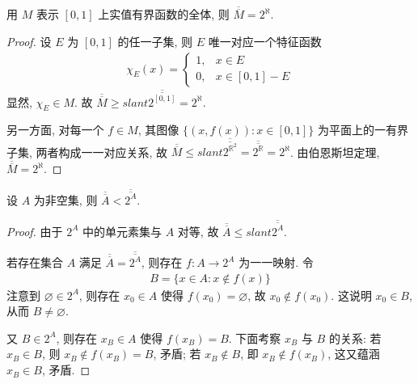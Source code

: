 \documentclass[../../main.tex]{subfiles}
\begin{document}
\begin{example}
用 $M$ 表示 $[0, 1]$ 上实值有界函数的全体, 则 $\overline{\overline{M}} = 2^{\aleph}$.
\end{example}
\begin{proof}
设 $E$ 为 $[0, 1]$ 的任一子集, 则 $E$ 唯一对应一个特征函数
\begin{align*}
\chi_E(x) = 
\begin{cases}
1, & x \in E\\
0, & x \in [0, 1] - E
\end{cases}
\end{align*}
显然, $\chi_E \in M$. 故 $\overline{\overline{M}} \geqslant slant \overline{\overline{2^{[0, 1]}}} = 2^{\aleph}$.

另一方面, 对每一个 $f \in M$, 其图像 $\{(x, f(x)) : x \in [0, 1]\}$ 为平面上的一有界子集, 两者构成一一对应关系, 故 $\overline{\overline{M}} \leqslant slant \overline{\overline{2^{\mathbb{R}^2}}} = \overline{\overline{2^{\mathbb{R}}}} = 2^{\aleph}$. 由伯恩斯坦定理, $\overline{\overline{M}} = 2^{\aleph}$. 
\end{proof}

\begin{theorem}[无最大基数定理]\label{theorem:无最大基数定理}
设 $A$ 为非空集, 则 $\overline{\overline{A}} < \overline{\overline{2^A}}$.
\end{theorem}
\begin{proof}
由于 $2^A$ 中的单元素集与 $A$ 对等, 故 $\overline{\overline{A}} \leqslant slant \overline{\overline{2^A}}$.

若存在集合 $A$ 满足 $\overline{\overline{A}} = \overline{\overline{2^A}}$, 则存在 $f : A \to 2^A$ 为一一映射. 令
\begin{align*}
B = \{x \in A : x \notin f(x)\}
\end{align*}
注意到 $\varnothing \in 2^A$, 则存在 $x_0 \in A$ 使得 $f(x_0) = \varnothing$, 故 $x_0 \notin f(x_0)$. 这说明 $x_0 \in B$, 从而 $B \neq \varnothing$.

又 $B \in 2^A$, 则存在 $x_B \in A$ 使得 $f(x_B) = B$. 下面考察 $x_B$ 与 $B$ 的关系: 若 $x_B \in B$, 则 $x_B \notin f(x_B) = B$, 矛盾; 若 $x_B \notin B$, 即 $x_B \notin f(x_B)$, 这又蕴涵 $x_B \in B$, 矛盾. 
\end{proof}
\end{document}
